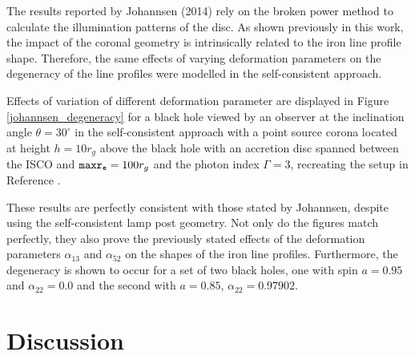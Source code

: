 \documentclass[fleqn,usenatbib,useAMS]{mnras}
\begin{document}
The results reported by Johannsen (2014) \cite{johannsen2014x} rely on the broken power method to calculate the illumination patterns of the disc. As shown previously in this work, the impact of the coronal geometry is intrinsically related to the iron line profile shape. Therefore, the same effects of varying deformation parameters on the degeneracy of the line profiles were modelled in the self-consistent approach.

Effects of variation of different deformation parameter are displayed in Figure \ref{johannsen_degeneracy} for a black hole viewed by an observer at the inclination angle $\theta = 30^{\circ}$ in the self-consistent approach with a point source corona located at height $h = 10 r_{g}$ above the black hole with an accretion disc spanned between the ISCO and ${\tt maxr_{e}} = 100 r_{g}$ and the photon index $\Gamma = 3$, recreating the setup in Reference \cite{johannsen2014x}.


These results are perfectly consistent with those stated by Johannsen, despite using the self-consistent lamp post geometry. Not only do the figures match perfectly, they also prove the previously stated effects of the deformation parameters $\alpha_{13}$ and $\alpha_{52}$ on the shapes of the iron line profiles. Furthermore, the degeneracy is shown to occur for a set of two black holes, one with spin $a = 0.95$ and $\alpha_{22} = 0.0$ and the second with $a = 0.85$, $\alpha_{22} = 0.97902$.


\section{Discussion} %





\end{document}
